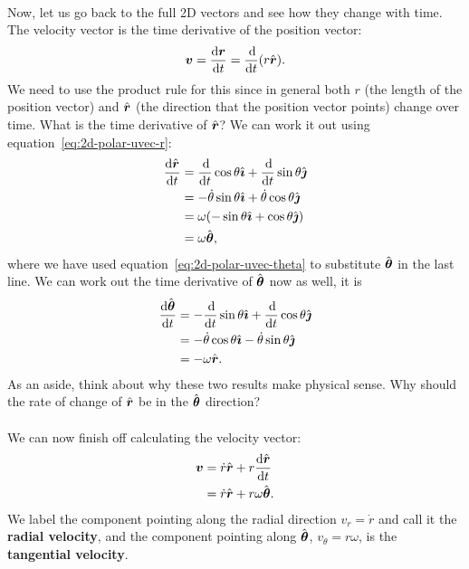 \documentclass[../classical_mechanics.tex]{subfiles}
\begin{document}
        \paragraph{}
        Now, let us go back to the full 2D vectors and see how they change with time.
        The velocity vector is the time derivative of the position vector:
        \begin{equation}
            \vec{v}=\dv{\vec{r}}{t}=\dv{}{t}(r\uvec{r}).
        \end{equation}
        We need to use the product rule for this since in general both $r$ (the length of the position vector) and $\hat{\boldsymbol{r}}$ (the direction that the position vector points) change over time.
        What is the time derivative of $\hat{\boldsymbol{r}}$?
        We can work it out using equation~\ref{eq:2d-polar-uvec-r}:
        \begin{align}
            \dv{\uvec{r}}{t}&=\dv{}{t}\cos\theta\ihat+\dv{}{t}\sin\theta\jhat\\
            &=-\dot{\theta}\sin\theta\ihat+\dot{\theta}\cos\theta\jhat\\
            &=\omega(-\sin\theta\ihat+\cos\theta\jhat)\\
            &=\omega\uvec{\theta}\label{eq:2d-polar-uvec-r-dot},
        \end{align}
        where we have used equation~\ref{eq:2d-polar-uvec-theta} to substitute $\hat{\boldsymbol{\theta}}$ in the last line.
        We can work out the time derivative of $\hat{\boldsymbol{\theta}}$ now as well, it is
        \begin{align}
            \dv{\uvec{\theta}}{t}&=-\dv{}{t}\sin\theta\ihat+\dv{}{t}\cos\theta\jhat\\
            &=-\dot{\theta}\cos\theta\ihat-\dot{\theta}\sin\theta\jhat\\
            &=-\omega\uvec{r}.\label{eq:2d-polar-uvec-theta-dot}
        \end{align}
        As an aside, think about why these two results make physical sense.
        Why should the rate of change of $\hat{\boldsymbol{r}}$ be in the $\hat{\boldsymbol{\theta}}$ direction?

        \paragraph{}
        We can now finish off calculating the velocity vector:
        \begin{align}
            \vec{v}&=\dot{r}\uvec{r}+r\dv{\uvec{r}}{t}\\
            &=\dot{r}\uvec{r}+r\omega\uvec{\theta}.\label{eq:2d-polar-velocity}
        \end{align}
        We label the component pointing along the radial direction $v_r=\dot{r}$ and call it the \textbf{radial velocity}, and the component pointing along $\hat{\boldsymbol{\theta}}$, $v_\theta=r\omega$, is the \textbf{tangential velocity}. 
        
\end{document}
